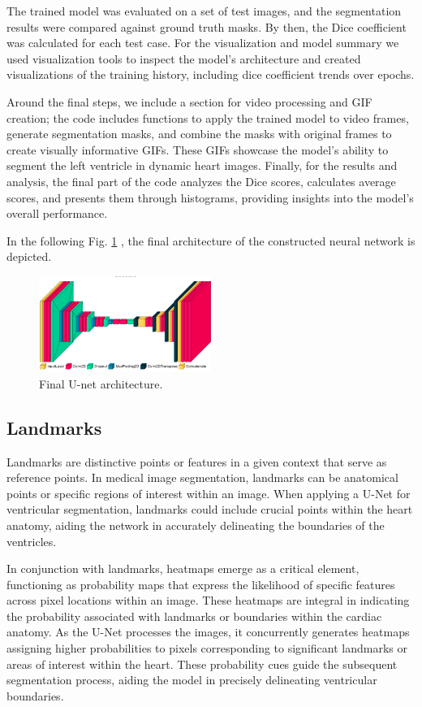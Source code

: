 \documentclass[runningheads]{llncs}
\begin{document}
The trained model was evaluated on a set of test images, and the segmentation results were compared against ground truth masks. By then, the Dice coefficient was calculated for each test case. For the visualization and model summary we used visualization tools to inspect the model's architecture and created visualizations of the training history, including dice coefficient trends over epochs.

Around the final steps, we include a section for video processing and GIF creation; the code includes functions to apply the trained model to video frames, generate segmentation masks, and combine the masks with original frames to create visually informative GIFs. These GIFs showcase the model's ability to segment the left ventricle in dynamic heart images.
Finally, for the results and analysis, the final part of the code analyzes the Dice scores, calculates average scores, and presents them through histograms, providing insights into the model's overall performance.

In the following Fig. \ref{fig:unet model} , the final architecture of the constructed neural network is depicted.
\begin{figure}[H]
  \centering
  \includegraphics[width=0.5\textwidth]{unet.png}
  \caption{Final U-net architecture.}
  \label{fig:unet model}
\end{figure}

\subsection{Landmarks}
Landmarks are distinctive points or features in a given context that serve as reference points. In medical image segmentation, landmarks can be anatomical points or specific regions of interest within an image. When applying a U-Net for ventricular segmentation, landmarks could include crucial points within the heart anatomy, aiding the network in accurately delineating the boundaries of the ventricles.

In conjunction with landmarks, heatmaps emerge as a critical element, functioning as probability maps that express the likelihood of specific features across pixel locations within an image. These heatmaps are integral in indicating the probability associated with landmarks or boundaries within the cardiac anatomy. As the U-Net processes the images, it concurrently generates heatmaps assigning higher probabilities to pixels corresponding to significant landmarks or areas of interest within the heart. These probability cues guide the subsequent segmentation process, aiding the model in precisely delineating ventricular boundaries.
\end{document}
